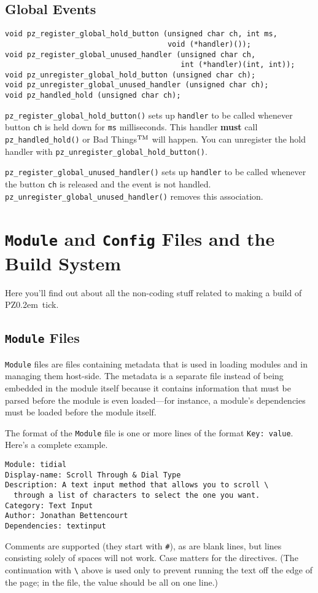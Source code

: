 \documentclass[12pt,letterpaper]{report}
\def\pz{{\footnotesize PZ}}
\def\pzt{\pz\kern0.2em{\large\oldstyle2}}
\let\ttt\tt
\def\tt{\def\_{{\ttt\char`\_}}\ttt}
\def\texttt#1{{\tt #1}}
\begin{document}
\section{Global Events}
\begin{verbatim}
void pz_register_global_hold_button (unsigned char ch, int ms,
                                     void (*handler)());
void pz_register_global_unused_handler (unsigned char ch,
                                        int (*handler)(int, int));
void pz_unregister_global_hold_button (unsigned char ch);
void pz_unregister_global_unused_handler (unsigned char ch);
void pz_handled_hold (unsigned char ch);
\end{verbatim}

\verb|pz_register_global_hold_button()| sets up \verb|handler| to be called
whenever button \verb|ch| is held down for \verb|ms| milliseconds. This handler
{\bf must} call \verb|pz_handled_hold()| or Bad Things$^{\rm TM}$ will happen.
You can unregister the hold handler with \verb|pz_unregister_global_hold_button()|.

\verb|pz_register_global_unused_handler()| sets up \verb|handler| to be called
whenever the button \verb|ch| is released and the event is not handled.
\verb|pz_|\hskip0pt\verb|unregister_|\hskip0pt\verb|global_unused_handler()| removes this association.

\chapter{\texttt{Module} and \texttt{Config} Files and the Build System}
Here you'll find out about all the non-coding stuff related to making a build of \pzt\ tick.

\section{\texttt{Module} Files}\label{moddesc}
\verb|Module| files are files containing metadata that is used in loading modules and in managing
them host-side.
The metadata is a separate file instead of being embedded in the module itself because it contains information
that must be parsed before the module is even loaded---for instance, a module's dependencies
must be loaded before the module itself.

The format of the \verb|Module| file is one or more lines of the format \verb|Key: value|.
Here's a complete example.
\begin{verbatim}
Module: tidial
Display-name: Scroll Through & Dial Type
Description: A text input method that allows you to scroll \
  through a list of characters to select the one you want.
Category: Text Input
Author: Jonathan Bettencourt
Dependencies: textinput
\end{verbatim}
Comments are supported (they start with \verb|#|),
as are blank lines, but lines consisting solely of spaces will not work.
Case matters for the directives. (The continuation with \verb|\| above is used
only to prevent running the text off the edge of the page; in the file, the
value should be all on one line.)
\end{document}
